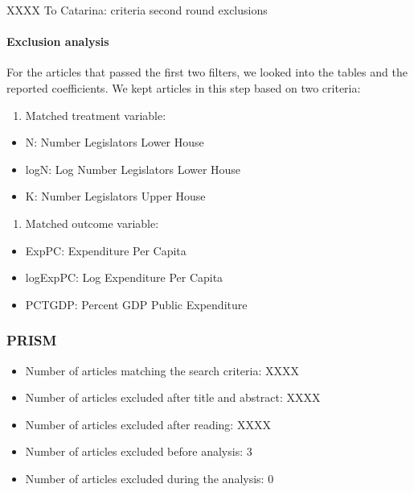 \documentclass[
]{article}
\providecommand{\tightlist}{%
  \setlength{\itemsep}{0pt}\setlength{\parskip}{0pt}}
\begin{document}
XXXX To Catarina: criteria second round exclusions

\hypertarget{exclusion-analysis}{%
\paragraph{Exclusion analysis}\label{exclusion-analysis}}

For the articles that passed the first two filters, we looked into the
tables and the reported coefficients. We kept articles in this step
based on two criteria:

\begin{enumerate}
\def\labelenumi{\arabic{enumi}.}
\tightlist
\item
  Matched treatment variable:
\end{enumerate}

\begin{itemize}
\tightlist
\item
  N: Number Legislators Lower House
\item
  logN: Log Number Legislators Lower House
\item
  K: Number Legislators Upper House
\end{itemize}

\begin{enumerate}
\def\labelenumi{\arabic{enumi}.}
\setcounter{enumi}{1}
\tightlist
\item
  Matched outcome variable:
\end{enumerate}

\begin{itemize}
\tightlist
\item
  ExpPC: Expenditure Per Capita
\item
  logExpPC: Log Expenditure Per Capita
\item
  PCTGDP: Percent GDP Public Expenditure
\end{itemize}

\hypertarget{prism}{%
\subsubsection{PRISM}\label{prism}}

\begin{itemize}
\tightlist
\item
  Number of articles matching the search criteria: XXXX
\item
  Number of articles excluded after title and abstract: XXXX
\item
  Number of articles excluded after reading: XXXX
\item
  Number of articles excluded before analysis: 3
\item
  Number of articles excluded during the analysis: 0
\end{itemize}
\end{document}

